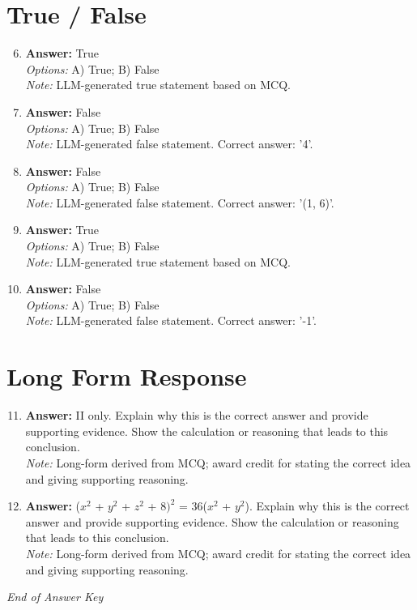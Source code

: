 \documentclass[12pt]{article}
\begin{document}
\section*{True / False}
\begin{enumerate}[label=\arabic*.]
\setcounter{enumi}{5}
\item \textbf{Answer:} True
\\ \textit{Options:} A) True; B) False
\\ \textit{Note:} LLM-generated true statement based on MCQ.
\item \textbf{Answer:} False
\\ \textit{Options:} A) True; B) False
\\ \textit{Note:} LLM-generated false statement. Correct answer: '4'.
\item \textbf{Answer:} False
\\ \textit{Options:} A) True; B) False
\\ \textit{Note:} LLM-generated false statement. Correct answer: '(1, 6)'.
\item \textbf{Answer:} True
\\ \textit{Options:} A) True; B) False
\\ \textit{Note:} LLM-generated true statement based on MCQ.
\item \textbf{Answer:} False
\\ \textit{Options:} A) True; B) False
\\ \textit{Note:} LLM-generated false statement. Correct answer: '-1'.
\end{enumerate}

\section*{Long Form Response}
\begin{enumerate}[label=\arabic*.]
\setcounter{enumi}{10}
\item \textbf{Answer:} II only. Explain why this is the correct answer and provide supporting evidence. Show the calculation or reasoning that leads to this conclusion.
\\ \textit{Note:} Long-form derived from MCQ; award credit for stating the correct idea and giving supporting reasoning.
\item \textbf{Answer:} ($x^2$ + $y^2$ + $z^2$ + $8)^2$ = 36($x^2$ + $y^2$). Explain why this is the correct answer and provide supporting evidence. Show the calculation or reasoning that leads to this conclusion.
\\ \textit{Note:} Long-form derived from MCQ; award credit for stating the correct idea and giving supporting reasoning.
\end{enumerate}

\vfill
\noindent\textit{End of Answer Key}
\end{document}
